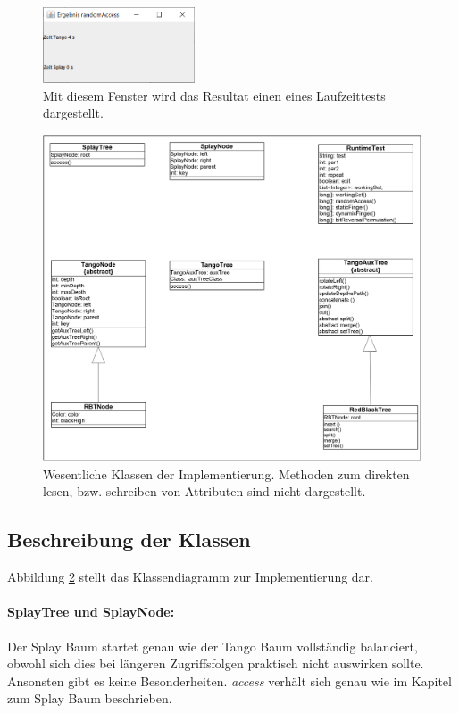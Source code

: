 \documentclass[a4paper,12pt]{article}
\begin{document}
\begin{figure}[H]
	\centering
	\includegraphics[width=0.4\textwidth]{"Medien/laufzeittest/ResultGUI"}
	\caption{Mit diesem Fenster wird das Resultat einen eines Laufzeittests dargestellt.}
	\label{fig:ResultGUI}
\end{figure}


\begin{figure}[H]
	\centering
	\includegraphics[width=1\textwidth]{"Medien/laufzeittest/klassen"}
	\caption{Wesentliche Klassen der Implementierung. Methoden zum direkten lesen, bzw. schreiben von Attributen sind nicht dargestellt. }
	\label{fig:klassen}
\end{figure}

\subsection{Beschreibung der Klassen }
Abbildung \ref{fig:klassen} stellt das Klassendiagramm zur Implementierung dar.
\paragraph{SplayTree und SplayNode:}
Der Splay Baum startet genau wie der Tango Baum vollständig balanciert, obwohl sich dies bei längeren Zugriffsfolgen praktisch nicht auswirken sollte. Ansonsten gibt es keine Besonderheiten. \textit{access} verhält sich genau wie im Kapitel zum Splay Baum beschrieben. 
\end{document}
